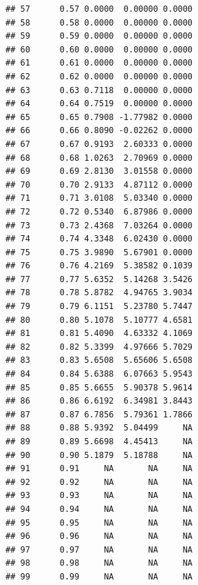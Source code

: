 \documentclass{article}\usepackage[]{graphicx}\usepackage[]{color}
\makeatletter
\newenvironment{kframe}{%
 \def\at@end@of@kframe{}%
 \ifinner\ifhmode%
  \def\at@end@of@kframe{\end{minipage}}%
  \begin{minipage}{\columnwidth}%
 \fi\fi%
 \def\FrameCommand##1{\hskip\@totalleftmargin \hskip-\fboxsep
 \colorbox{shadecolor}{##1}\hskip-\fboxsep
     \hskip-\linewidth \hskip-\@totalleftmargin \hskip\columnwidth}%
 \MakeFramed {\advance\hsize-\width
   \@totalleftmargin\z@ \linewidth\hsize
   \@setminipage}}%
 {\par\unskip\endMakeFramed%
 \at@end@of@kframe}
\newenvironment{knitrout}{}{} %
\makeatother
\begin{document}
\begin{knitrout}
\begin{kframe}
\begin{verbatim}
## 57      0.57 0.0000  0.00000 0.0000
## 58      0.58 0.0000  0.00000 0.0000
## 59      0.59 0.0000  0.00000 0.0000
## 60      0.60 0.0000  0.00000 0.0000
## 61      0.61 0.0000  0.00000 0.0000
## 62      0.62 0.0000  0.00000 0.0000
## 63      0.63 0.7118  0.00000 0.0000
## 64      0.64 0.7519  0.00000 0.0000
## 65      0.65 0.7908 -1.77982 0.0000
## 66      0.66 0.8090 -0.02262 0.0000
## 67      0.67 0.9193  2.60333 0.0000
## 68      0.68 1.0263  2.70969 0.0000
## 69      0.69 2.8130  3.01558 0.0000
## 70      0.70 2.9133  4.87112 0.0000
## 71      0.71 3.0108  5.03340 0.0000
## 72      0.72 0.5340  6.87986 0.0000
## 73      0.73 2.4368  7.03264 0.0000
## 74      0.74 4.3348  6.02430 0.0000
## 75      0.75 3.9890  5.67901 0.0000
## 76      0.76 4.2169  5.38582 0.1039
## 77      0.77 5.6352  5.14268 3.5426
## 78      0.78 5.8782  4.94765 3.9034
## 79      0.79 6.1151  5.23780 5.7447
## 80      0.80 5.1078  5.10777 4.6581
## 81      0.81 5.4090  4.63332 4.1069
## 82      0.82 5.3399  4.97666 5.7029
## 83      0.83 5.6508  5.65606 5.6508
## 84      0.84 5.6388  6.07663 5.9543
## 85      0.85 5.6655  5.90378 5.9614
## 86      0.86 6.6192  6.34981 3.8443
## 87      0.87 6.7856  5.79361 1.7866
## 88      0.88 5.9392  5.04499     NA
## 89      0.89 5.6698  4.45413     NA
## 90      0.90 5.1879  5.18788     NA
## 91      0.91     NA       NA     NA
## 92      0.92     NA       NA     NA
## 93      0.93     NA       NA     NA
## 94      0.94     NA       NA     NA
## 95      0.95     NA       NA     NA
## 96      0.96     NA       NA     NA
## 97      0.97     NA       NA     NA
## 98      0.98     NA       NA     NA
## 99      0.99     NA       NA     NA
\end{verbatim}
\end{kframe}
\end{knitrout}
\end{document}
